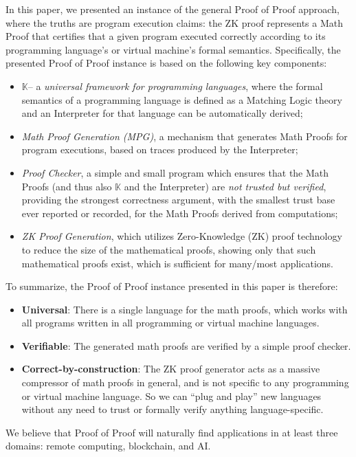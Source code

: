 \documentclass{article}
\theoremstyle{plain}
\theoremstyle{definition}
\newcommand{\K}{$\mathbb{K}$\xspace}
\begin{document}
In this paper, we presented an instance of the general Proof of Proof approach, where the truths are program execution claims: the ZK proof represents a Math Proof that certifies that a given program executed correctly according to its programming language's or virtual machine's formal semantics.  Specifically, the presented Proof of Proof instance is based on the following key components:
\begin{itemize}
\item \K -- a \emph{universal framework for programming languages}, where the formal semantics of a programming language is defined as a Matching Logic theory and an Interpreter for that language can be automatically derived;
\item \emph{Math Proof Generation (MPG)}, a mechanism that generates Math Proofs for program executions, based on traces produced by the Interpreter; 
\item \emph{Proof Checker}, a simple and small program which ensures that the Math Proofs (and thus also \K and the Interpreter) are \textit{not trusted but verified}, providing the strongest correctness argument, with the smallest trust base ever reported or recorded, for the Math Proofs derived from computations;
\item \emph{ZK Proof Generation}, which utilizes Zero-Knowledge (ZK) proof technology to reduce the size of the mathematical proofs, showing only that such mathematical proofs exist, which is sufficient for many/most applications.
\end{itemize}
To summarize, the Proof of Proof instance presented in this paper is therefore:
\begin{itemize}
\item[\checkmark] \textbf{Universal}: There is a single language for the math proofs, which works with all programs written in all programming or virtual machine languages.
\item[\checkmark] \textbf{Verifiable}: The generated math proofs are verified by a simple proof checker.
\item[\checkmark] \textbf{Correct-by-construction}: The ZK proof generator acts as a massive compressor of math proofs in general, and is not specific to any programming or virtual machine language.  So we can ``plug and play'' new languages without any need to trust or formally verify anything language-specific.
\end{itemize}
We believe that Proof of Proof will naturally find applications in at least three domains: remote computing, blockchain, and AI.
\end{document}
